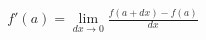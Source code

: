 \documentclass[preview]{standalone}
\begin{document}
\begin{align*}
f'(a) = \lim_{dx \to 0} \frac{f(a+dx) - f(a)}{dx}
\end{align*}
\end{document}
